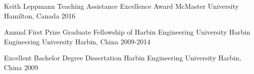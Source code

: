 \begin{center}
	
\end{center}%




\begin{cvhonors}

  \cvhonor
    {Keith Leppmann Teaching Assistance Excellence Award} %
    {McMaster University} %
    {Hamilton, Canada} %
    {2016} %

  \cvhonor
    {Annual First Prize Graduate Fellowship of Harbin Engineering University} %
    {Harbin Engineering University} %
    {Harbin, China} %
    {2009-2014} %

  \cvhonor
    {Excellent Bachelor Degree Dissertation} %
    {Harbin Engineering University} %
    {Harbin, China} %
    {2009} %

\end{cvhonors}







